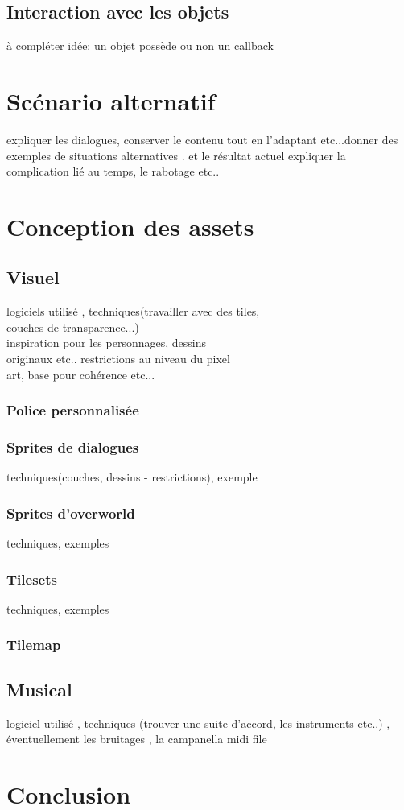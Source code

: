 \documentclass[11pt]{article}
\begin{document}
\subsection{Interaction avec les objets}
à compléter idée: un objet possède ou non un callback 


\section{Scénario alternatif}
expliquer les dialogues, conserver le contenu tout en l'adaptant etc...donner des exemples de situations alternatives . et le résultat actuel
expliquer la complication lié au temps, le rabotage etc..
\section{Conception des assets}
\subsection{Visuel}
logiciels utilisé , techniques(travailler avec des tiles, \\ couches de transparence...)\\ inspiration pour les personnages, dessins\\ originaux etc.. restrictions au niveau du pixel\\ art, base pour cohérence etc...
\subsubsection{Police personnalisée}
\subsubsection{Sprites de dialogues}
techniques(couches, dessins - restrictions), exemple 
\subsubsection{Sprites d'overworld}
techniques, exemples
\subsubsection{Tilesets}
techniques, exemples
\subsubsection{Tilemap}
\subsection{Musical}
logiciel utilisé , techniques (trouver une suite d'accord, les instruments etc..) , éventuellement les bruitages , la campanella midi file
\section{Conclusion}
\end{document}
